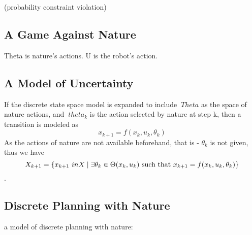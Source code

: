 (probability constraint violation)

\subsection{A Game Against Nature}

Theta is nature's actions. U is the robot's action.

\subsection{A Model of Uncertainty}

If the discrete state space model is expanded to include \(\ Theta\) as the
space of nature actions, and \(\ theta_k\) is the action selected by nature at
step k, then a transition is modeled as
\[
  x_{k+1} = f(x_k,u_k,\theta_k)
\]
As the actions of nature are not available beforehand, that is - \(\theta_ k\) is
not given, thus we have
\[
  X_{k+1} =  \lbrace x_{k+1} \ in X \mid \exists\theta_k \in \Theta(x_k,u_k)
    \text{ such that }
    x_{k+1} = f(x_k,u_k,\theta_k)\rbrace
\]
\cite{Lav06}.

\subsection{Discrete Planning with Nature}
a model of discrete planning with nature: \cite[pg,496]{Lav06}

